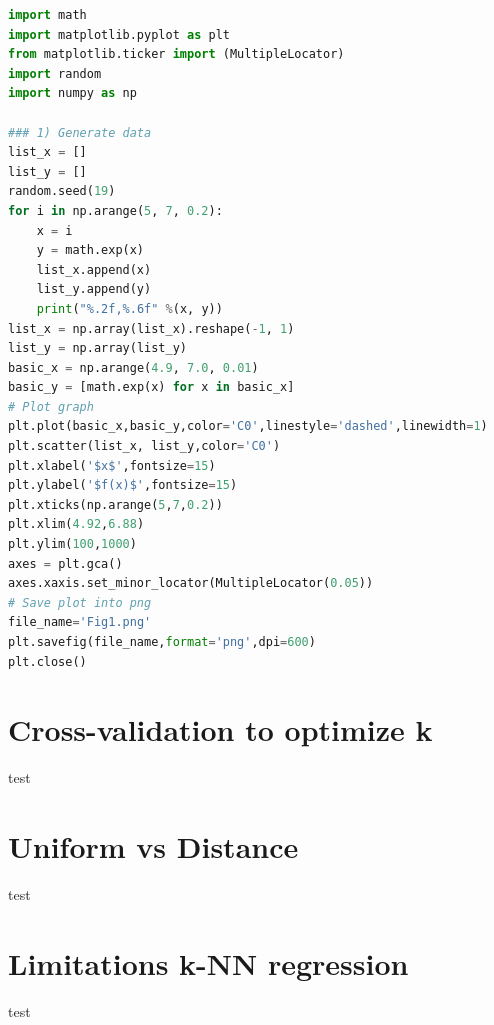 \documentclass{article}%
\begin{document}
\begin{lstlisting}[language=Python, caption=Code1,backgroundcolor=\color{lightgrey},keywordstyle=\color{darkgreen},commentstyle=\color{red}]
import math
import matplotlib.pyplot as plt 
from matplotlib.ticker import (MultipleLocator)
import random
import numpy as np

### 1) Generate data
list_x = []
list_y = []
random.seed(19)
for i in np.arange(5, 7, 0.2):
    x = i 
    y = math.exp(x)
    list_x.append(x)
    list_y.append(y)
    print("%.2f,%.6f" %(x, y)) 
list_x = np.array(list_x).reshape(-1, 1)
list_y = np.array(list_y)
basic_x = np.arange(4.9, 7.0, 0.01)
basic_y = [math.exp(x) for x in basic_x]
# Plot graph
plt.plot(basic_x,basic_y,color='C0',linestyle='dashed',linewidth=1)
plt.scatter(list_x, list_y,color='C0')
plt.xlabel('$x$',fontsize=15)
plt.ylabel('$f(x)$',fontsize=15)
plt.xticks(np.arange(5,7,0.2))
plt.xlim(4.92,6.88)
plt.ylim(100,1000)
axes = plt.gca()
axes.xaxis.set_minor_locator(MultipleLocator(0.05))
# Save plot into png
file_name='Fig1.png'
plt.savefig(file_name,format='png',dpi=600)
plt.close()
\end{lstlisting}


\section{Cross-validation to optimize k}
test
\section{Uniform vs Distance}
test
\section{Limitations k-NN regression}
test
\end{document}

